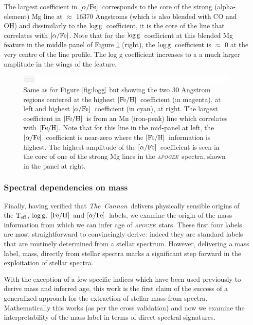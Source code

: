 \documentclass[12pt, preprint]{aastex}
\newcommand{\project}[1]{\textsl{#1}}
\newcommand{\tc}{\project{The~Cannon}}
\newcommand{\apogee}{\project{\textsc{apogee}}}
\newcommand{\teff}{\mbox{$\rm T_{eff}$}}
\newcommand{\feh}{\mbox{$\rm [Fe/H]$}}
\newcommand{\alphafe}{\mbox{$\rm [\alpha/Fe]$}}
\newcommand{\logg}{\mbox{$\rm \log g$}}
\begin{document}
The largest coefficient in \alphafe\ corresponds to the core of the strong (alpha-element) Mg line at $\approx$ 16370 Angstroms (which is also blended with CO and OH) and dissimilarly to the \logg\ coefficient, it is the core of the line that correlates with \alphafe. Note that for the \logg\ coefficient at this blended Mg feature in the middle panel of Figure \ref{fig:feha} (right), the \logg\ coefficient is $\approx$ 0 at the very centre of the line profile. The log g coefficient increases to a a much larger amplitude in the wings of the feature.


\begin{figure}[p]
\centering
    \includegraphics[scale=0.51]{./plots/coeffs_af_3.png}
  \caption{Same as for Figure \ref{fig:logg} but showing the two 30 Angstrom regions centered at the highest \feh\ coefficient (in magenta), at left and highest \alphafe\ coefficient (in cyan), at right. The largest coefficient in \feh\ is from an Mn (iron-peak) line which correlates with \feh. Note that for this line in the mid-panel at left, the \alphafe\ coefficient is near-zero where the \feh\ information is highest. The highest amplitude of the \alphafe\ coefficient is seen in the core of one of the strong Mg lines in the \apogee\ spectra, shown in the panel at right.}
\label{fig:feha}
\end{figure}



\subsubsection{Spectral dependencies on mass} 

Finally, having verified that \tc\ delivers physically sensible origins of the \teff, \logg, \feh\ and \alphafe\ labels, we examine the origin of the mass information from which we can infer age of \apogee\ stars. 
These first four labels are most straightforward  to convincingly derive: indeed they are standard labels that are routinely determined from a stellar spectrum. However, delivering a mass label, mass, directly from stellar spectra marks a significant step forward in the exploitation of stellar spectra. 

With the exception of a few specific indices which have been used previously to derive mass and inferred age, this work is the first claim of the success of a generalized approach for the extraction of stellar mass from spectra.  Mathematically this works (as per the cross validation) and now we examine the interpretability of the mass label in terms of direct spectral signatures. 
\end{document}
